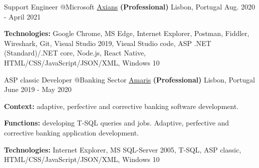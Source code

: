 \begin{cventries}
  \cventry
    {Support Engineer @Microsoft} %
    {\href{https://www.axians.pt/pt/}{Axians} \textbf{(Professional)}} %
    {Lisbon, Portugal} %
    {Aug. 2020 - April 2021} %
    {
      \begin{cvitems} %
		\item[] {\textbf{Technologies:} 
		\textcolor{rainbowcolor-olive}{Google Chrome}, 
		\textcolor{rainbowcolor-olive}{MS Edge}, 
		\textcolor{rainbowcolor-olive}{Internet Explorer},
		\textcolor{rainbowcolor-olive}{Postman},
		\textcolor{rainbowcolor-olive}{Fiddler}, 
		\textcolor{rainbowcolor-olive}{Wireshark},		
		\textcolor{rainbowcolor-olive}{Git},    
		\textcolor{rainbowcolor-olive}{Visual Studio 2019}, 
		\textcolor{rainbowcolor-olive}{Visual Studio code}, 
		\textcolor{rainbowcolor-indigo}{ASP .NET (Standard)/.NET core}, 
		\textcolor{rainbowcolor-indigo}{Node.js}, 
		\textcolor{rainbowcolor-indigo}{React Native}, 
		\textcolor{rainbowcolor-indigo}{HTML/CSS/JavaScript/JSON/XML}, 		
		\textcolor{rainbowcolor-orange}{Windows 10}}			
      \end{cvitems}		
    } 

  \cventry
    {ASP classic Developer @Banking Sector %
  } %
    {\href{https://www.amaris.com/}{Amaris} \textbf{(Professional)}} %
    {Lisbon, Portugal} %
    {June 2019 - May 2020} %
    {
      \begin{cvitems} %
		\item[] {\textbf{Context:} adaptive, perfective and corrective banking software development. 
}
		\item[] {\textbf{Functions:} developing T-SQL queries and jobs. Adaptive, perfective and corrective banking application development.}		
		\item[] {\textbf{Technologies:} 
		\textcolor{rainbowcolor-olive}{Internet Explorer}, 
		\textcolor{rainbowcolor-olive}{MS SQL-Server 2005}, 
		\textcolor{rainbowcolor-indigo}{T-SQL}, 
		\textcolor{rainbowcolor-indigo}{ASP classic}, 
		\textcolor{rainbowcolor-indigo}{HTML/CSS/JavaScript/JSON/XML}, 
		\textcolor{rainbowcolor-orange}{Windows 10}}		
      \end{cvitems}
    } 
    

\end{cventries}
